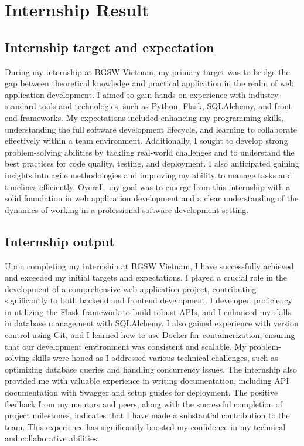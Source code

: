 \section{Internship Result}

\subsection{Internship target and expectation}

During my internship at BGSW Vietnam, my primary target was to bridge the gap between theoretical knowledge and practical application in the realm of web application development. I aimed to gain hands-on experience with industry-standard tools and technologies, such as Python, Flask, SQLAlchemy, and front-end frameworks. My expectations included enhancing my programming skills, understanding the full software development lifecycle, and learning to collaborate effectively within a team environment. Additionally, I sought to develop strong problem-solving abilities by tackling real-world challenges and to understand the best practices for code quality, testing, and deployment. I also anticipated gaining insights into agile methodologies and improving my ability to manage tasks and timelines efficiently. Overall, my goal was to emerge from this internship with a solid foundation in web application development and a clear understanding of the dynamics of working in a professional software development setting.

\subsection{Internship output}

Upon completing my internship at BGSW Vietnam, I have successfully achieved and exceeded my initial targets and expectations. I played a crucial role in the development of a comprehensive web application project, contributing significantly to both backend and frontend development. I developed proficiency in utilizing the Flask framework to build robust APIs, and I enhanced my skills in database management with SQLAlchemy. I also gained experience with version control using Git, and I learned how to use Docker for containerization, ensuring that our development environment was consistent and scalable. My problem-solving skills were honed as I addressed various technical challenges, such as optimizing database queries and handling concurrency issues. The internship also provided me with valuable experience in writing documentation, including API documentation with Swagger and setup guides for deployment. The positive feedback from my mentors and peers, along with the successful completion of project milestones, indicates that I have made a substantial contribution to the team. This experience has significantly boosted my confidence in my technical and collaborative abilities.

